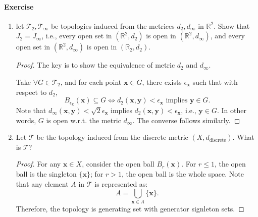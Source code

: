 \paragraph{Exercise}
\begin{enumerate}
\item
let $\mathcal{T}_2,\mathcal{T}_\infty$ be topologies induced from the metrices $d_2,d_\infty$ in $\mathbb{R}^2$. Show that $J_2=J_\infty$, i.e., every open set in $(\mathbb{R}^2,d_2)$ is open in $(\mathbb{R}^2,d_\infty)$, and every open set in $(\mathbb{R}^2,d_\infty)$ is open in $(\mathbb{R}_2,d_2)$.
\begin{proof}
The key is to show the equivalence of metric $d_2$ and $d_\infty$.

Take $\forall G\in\mathcal{T}_2$, and for each point $\bm x\in G$, there exists $\epsilon_{\bm x}$ such that with respect to $d_2$,
\[
B_{\epsilon_{\bm x}}(\bm x)\subseteq G\Longleftrightarrow
d_2(\bm x,\bm y)<\epsilon_{\bm x}\mbox{ implies }\bm y\in G.
\]
Note that $d_\infty(\bm x,\bm y)<\sqrt{2}\epsilon_{\bm x}$ implies $d_2(\bm x,\bm y)<\epsilon_{\bm x}$, i.e., $\bm y\in G$. In other words, $G$ is open w.r.t. the metric $d_\infty$. The converse follows similarly.
\end{proof}






\item
Let $\mathcal{T}$ be the topology induced from the discrete metric $(X,d_{\text{discrete}}).$ What is $\mathcal{T}$?
\begin{proof}
For any $\bm x\in X$, consider the open ball $B_r(\bm x)$. For $r\le 1$, the open ball is the singleton $\{\bm x\}$; for $r>1$, the open ball is the whole space. Note that any element $A$ in $\mathcal{T}$ is represented as:
\[
A=\bigcup_{\bm x\in A}\{\bm x\}.
\]
Therefore, the topology is generating set with generator signleton sets.
\end{proof}

\end{enumerate}













